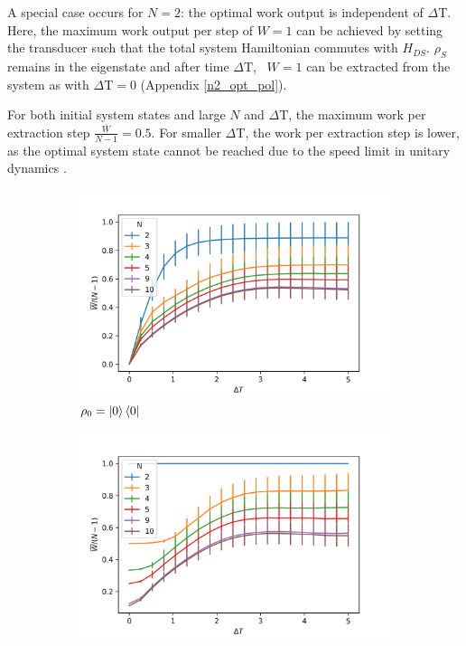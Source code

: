 A special case occurs for $N = 2$: the optimal work output is independent of $\Delta \mathrm{T}$.
Here, the maximum work output per step of $W = 1$ can be achieved by setting the transducer such that the total system Hamiltonian commutes with $H_{DS}$. $\rho_S$ remains in the eigenstate and after time $\Delta \mathrm{T}$, \ $W = 1$ can be extracted from the system as with $\Delta \mathrm{T} = 0$ (Appendix \ref{n2_opt_pol}).

For both initial system states and large $N$ and $\Delta \mathrm{T}$, the maximum work per extraction step $\frac{\overline{W}}{N-1} = 0.5$.
For smaller $\Delta \mathrm{T}$, the work per extraction step is lower, as the optimal system state cannot be reached due to the speed limit in unitary dynamics \cite{Deffner_2017, PhysRevA.67.052109}.

\begin{figure}[h]
	\centering
	\begin{subfigure}{0.4\textwidth}
		\centering
		\includegraphics[width=\textwidth]{img/dt_0}
		\caption{$\rho_0 = \ket{0}\bra{0}$}
		\label{dt_0}
	\end{subfigure}
	\begin{subfigure}{0.4\textwidth}
	\centering
	\includegraphics[width=\textwidth]{img/dt_eigen}

\end{subfigure}
\end{figure}
